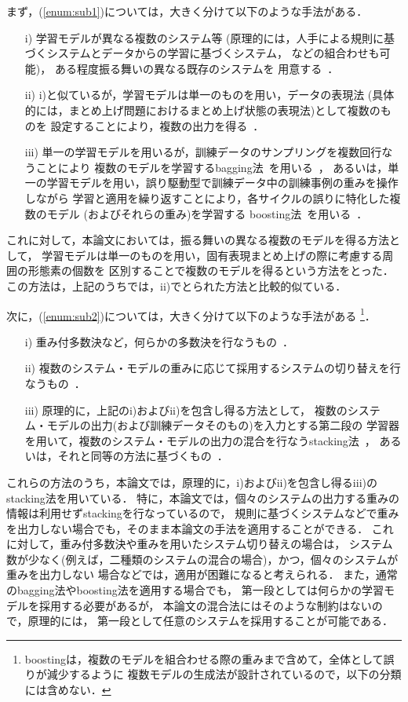 まず，(\ref{enum:sub1})については，大きく分けて以下のような手法がある．
\begin{enumerate}
\item[i)] 学習モデルが異なる複数のシステム等
	(原理的には，人手による規則に基づくシステムとデータからの学習に基づくシステム，
	などの組合わせも可能)，
	ある程度振る舞いの異なる既存のシステムを
	用意する~\cite{vanHalteren98a,Brill98a,Henderson99a,KoInui00aj,Sang00a}．
\item[ii)] i)と似ているが，学習モデルは単一のものを用い，データの表現法
	(具体的には，まとめ上げ問題におけるまとめ上げ状態の表現法)として複数のものを
	設定することにより，複数の出力を得る~\cite{Sang00a,TKudo00ajx}．
\item[iii)] 単一の学習モデルを用いるが，訓練データのサンプリングを複数回行なうことにより
	複数のモデルを学習するbagging法~\cite{Breiman96b}を用いる~\cite{Henderson00a}，
	あるいは，単一の学習モデルを用い，誤り駆動型で訓練データ中の訓練事例の重みを操作しながら
	学習と適用を繰り返すことにより，各サイクルの誤りに特化した複数のモデル
	(およびそれらの重み)を学習する
	boosting法~\cite{Freund99aj}を用いる~\cite{Haruno97a,Haruno99a,Abney99a,Henderson00a}．
\end{enumerate}
これに対して，本論文においては，振る舞いの異なる複数のモデルを得る方法として，
学習モデルは単一のものを用い，固有表現まとめ上げの際に考慮する周囲の形態素の個数を
区別することで複数のモデルを得るという方法をとった．
この方法は，上記のうちでは，ii)でとられた方法と比較的似ている．

次に，(\ref{enum:sub2})については，大きく分けて以下のような手法がある
\footnote{
  boostingは，複数のモデルを組合わせる際の重みまで含めて，全体として誤りが減少するように
  複数モデルの生成法が設計されているので，以下の分類には含めない．
}．
\begin{enumerate}
\item[i)] 重み付多数決など，何らかの多数決を行なうもの~\cite{Breiman96b,vanHalteren98a,Brill98a,Henderson99a,KoInui00aj,Sang00a,Henderson00a,TKudo00ajx}．
\item[ii)] 複数のシステム・モデルの重みに応じて採用するシステムの切り替えを行なうもの~\cite{Henderson99a,KoInui00aj}．
\item[iii)] 原理的に，上記のi)およびii)を包含し得る方法として，
	複数のシステム・モデルの出力(および訓練データそのもの)を入力とする第二段の
	学習器を用いて，複数のシステム・モデルの出力の混合を行なうstacking法~\cite{Wolpert92a}，
	あるいは，それと同等の方法に基づくもの~\cite{vanHalteren98a,Brill98a,Sang00a}．
\end{enumerate}
これらの方法のうち，本論文では，原理的に，i)およびii)を包含し得るiii)のstacking法を用いている．
特に，本論文では，個々のシステムの出力する重みの情報は利用せずstackingを行なっているので，
規則に基づくシステムなどで重みを出力しない場合でも，そのまま本論文の手法を適用することができる．
これに対して，重み付多数決や重みを用いたシステム切り替えの場合は，
システム数が少なく(例えば，二種類のシステムの混合の場合)，かつ，個々のシステムが重みを出力しない
場合などでは，適用が困難になると考えられる．
また，通常のbagging法やboosting法を適用する場合でも，
第一段としては何らかの学習モデルを採用する必要があるが，
本論文の混合法にはそのような制約はないので，原理的には，
第一段として任意のシステムを採用することが可能である．

